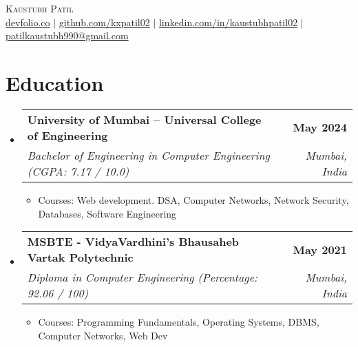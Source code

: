 \documentclass[letterpaper,11pt]{article}
\makeatletter
\newcommand{\resumeItem}[1]{
  \item\small{
    {#1 \vspace{-2pt}}
  }
}
\newcommand{\resumeSubheading}[4]{
  \vspace{-2pt}\item
    \begin{tabular*}{1.0\textwidth}[t]{l@{\extracolsep{\fill}}r}
      \vspace{-2pt}\textbf{#1} & \textbf{\small #2} \\
      \textit{\small#3} & \textit{\small #4} \\
    \end{tabular*}\vspace{-7pt}
}
\newcommand{\resumeSubHeadingListStart}{\begin{itemize}[leftmargin=0.0in, label={}]}
\newcommand{\resumeSubHeadingListEnd}{\end{itemize}}
\newcommand{\resumeItemListStart}{\begin{itemize}}
\newcommand{\resumeItemListEnd}{\end{itemize}\vspace{-5pt}}
\makeatother
\begin{document}

\begin{center}
    {\huge \scshape Kaustubh Patil} \\ \vspace{5pt}
    \small
    \href{https://devfolio.co/@kxpatil02}{devfolio.co} $|$ \href{https://github.com/kxpatil02}{github.com/kxpatil02} $|$ \href{https://www.linkedin.com/in/kaustubhpatil02/}{linkedin.com/in/kaustubhpatil02} $|$ \href{mailto:contact@patilkaustubh990@gmail.com}{patilkaustubh990@gmail.com}
    \vspace{-8pt}
\end{center}


\section{Education}
    \resumeSubHeadingListStart
        \resumeSubheading
            {University of Mumbai --  Universal College of Engineering}{May 2024}
            {Bachelor of Engineering in Computer Engineering  (CGPA: 7.17  / 10.0)}{Mumbai, India}
            \resumeItemListStart
                \resumeItem{Courses:  Web development. DSA, Computer Networks, Network Security, Databases, Software Engineering}
            \resumeItemListEnd

        \resumeSubheading
            {MSBTE - VidyaVardhini’s Bhausaheb Vartak Polytechnic}{May 2021}
            {Diploma in Computer Engineering (Percentage: 92.06 / 100)}{Mumbai, India}
            \resumeItemListStart
                \resumeItem{Courses:  Programming Fundamentals, Operating Systems, DBMS, Computer Networks, Web Dev
                }
            \resumeItemListEnd
    \resumeSubHeadingListEnd
\vspace{-19pt}


\end{document}
